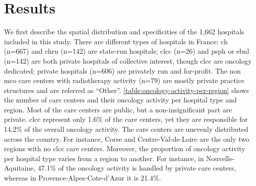 \section{Results}

We first describe the spatial distribution and specificities of the 1,662
hospitals included in this study. There are different types of hospitals in
France: \ac{ch}  (n=667) and \ac{chru}  (n=142) are state-run hospitals;
\ac{clcc} (n=26) and \ac{psph} or \ac{ebnl} (n=142) are both private hospitals of
collective interest, though \ac{clcc} are oncology dedicated; private hospitals
(n=606) are privately run and for-profit. The non \ac{mco} care centers with
radiotherapy activity (n=79) are mostly private practice structures and are
referred as “Other”. \cref{table:oncology-activity-per-region} shows the number
of care centers and their oncology activity per hospital type and region. Most
of the care centers are public, but a non-insignificant part are private.
\ac{clcc} represent only 1.6\% of the care centers, yet they are responsible for
14.2\% of the overall oncology activity. The care centers are unevenly
distributed across the country. For instance, Corse and Centre-Val-de-Loire are
the only two regions with no \ac{clcc} care centers. Moreover, the proportion of
oncology activity per hospital type varies from a region to another. For
instance, in Nouvelle-Aquitaine, 47.1\% of the oncology activity is handled by
private care centers, whereas in Provence-Alpes-Cote-d'Azur it is 21.4\%.

